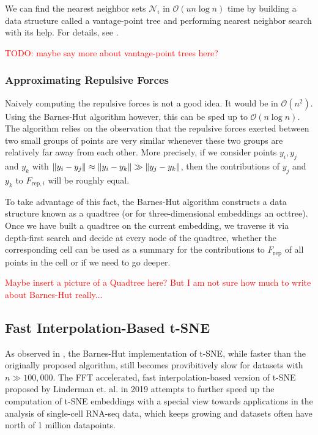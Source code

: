 We can find the nearest neighbor sets $\mathcal{N}_i$ in $\mathcal{O}(u n \log n)$ time by building a data structure called a vantage-point tree and performing nearest neighbor search with its help. For details, see \cite{vdMaa14}. 

\textcolor{red}{TODO: maybe say more about vantage-point trees here?}

\subsubsection{Approximating Repulsive Forces}
Naively computing the repulsive forces is not a good idea. It would be in $\mathcal{O}(n^2)$. 
Using the Barnes-Hut algorithm however, this can be sped up to $\mathcal{O}(n \log n)$. 
The algorithm relies on the observation that the repulsive forces exerted between two small groups of points are very similar whenever these two groups are relatively far away from each other. 
More precisely, if we consider points $y_i, y_j$ and $y_k$ with $\lVert y_i - y_j\rVert \approx \lVert y_i - y_k\rVert \gg \lVert y_j - y_k\rVert$, then the contributions of $y_j$ and $y_k$ to $F_{\text{rep}, i}$ will be roughly equal. 

To take advantage of this fact, the Barnes-Hut algorithm constructs a data structure known as a quadtree (or for three-dimensional embeddings an octtree). 
Once we have built a quadtree on the current embedding, we traverse it via depth-first search and decide at every node of the quadtree, whether the corresponding cell can be used as a summary for the contributions to $F_{\text{rep}}$ of all points in the cell or if we need to go deeper. 

\textcolor{red}{Maybe insert a picture of a Quadtree here? But I am not sure how much to write about Barnes-Hut really...}

\subsection{Fast Interpolation-Based t-SNE}
As observed in \cite{KoBe19SingleCell}, the Barnes-Hut implementation of t-SNE, while faster than the originally proposed algorithm, still becomes provibitively slow for datasets with $n \gg 100,000$. 
The FFT accelerated, fast interpolation-based version of t-SNE proposed by Linderman et. al. in 2019 \cite{Lin19} attempts to further speed up the computation of t-SNE embeddings with a special view towards applications in the analysis of single-cell RNA-seq data, which keeps growing and datasets often have north of 1 million datapoints. 

